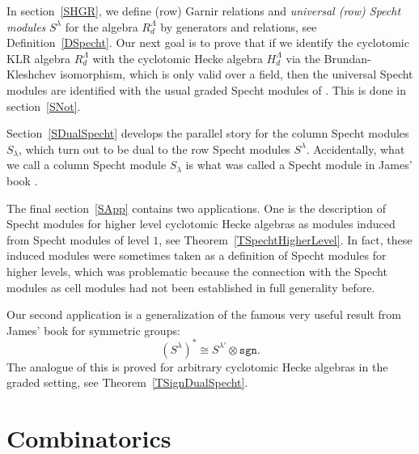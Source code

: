 \documentclass[twoside,11pt,reqno]{amsart}
\numberwithin{equation}{section}
\theoremstyle{definition}  %
\newcommand\Comment[2][\relax]{\space\par\medskip\noindent%
   \fbox{\begin{minipage}{\textwidth}\textbf{Comment\ifx\relax#1\else---#1\fi}\newline%
        #2\end{minipage}}\medskip
}
\def\sgn{\mathtt{sgn}}
\newcommand{\0}{{\bar 0}}
\newcommand{\1}{{\bar 1}}
\newcommand{\la}{\lambda}
\newcommand{\La}{\Lambda}
\begin{document}
In section~\ref{SHGR}, we define (row) Garnir relations and {\em universal (row) Specht modules} $S^\la$ for the algebra $R^\Lambda_d$ by generators and relations, see Definition~\ref{DSpecht}. Our next goal is to prove that if we identify the cyclotomic KLR algebra $R_d^\La$ with the cyclotomic Hecke algebra $H_d^\La$ via the Brundan-Kleshchev isomorphism, which is only valid over a field, then the universal Specht modules are identified with the usual graded Specht modules of \cite{BKW}. This is done in section~\ref{SNot}.

Section~\ref{SDualSpecht}  develops the parallel story for the column Specht modules $S_\la$, which turn out to be dual to the row Specht modules $S^\la$. 
Accidentally, %
what we call a column Specht module $S_\la$ is what was called a Specht module in James' book \cite{Jbook}. 

The final section~\ref{SApp} contains two applications. One is the description of Specht modules for higher level cyclotomic Hecke algebras as modules induced from Specht modules of level $1$, see Theorem~\ref{TSpechtHigherLevel}. %
In fact, these induced modules were sometimes taken as a definition of Specht modules for higher levels, which was problematic because the connection with the Specht modules as cell modules had not been established in full generality before.

Our second application is a generalization of the famous very useful result from James' book \cite[Theorem 8.15]{Jbook} for symmetric groups: 
$$(S^\la)^*\cong S^{\la'}\otimes \sgn.$$ 
The analogue of this is proved for arbitrary cyclotomic Hecke algebras in the graded setting, see Theorem~\ref{TSignDualSpecht}. 


\section{Combinatorics}\label{SComb}
\end{document}
